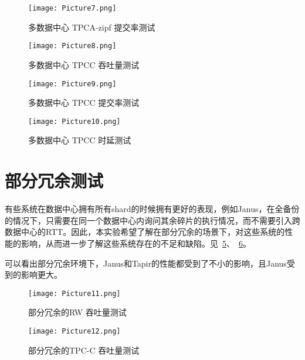 \begin{figure}[htb]
  \centering
  \texttt{[image: Picture7.png]}
  \caption{多数据中心 TPCA-zipf 提交率测试}
  \label{fig:pic7}
\end{figure}

\begin{figure}[htb]
  \centering
  \texttt{[image: Picture8.png]}
  \caption{多数据中心 TPCC 吞吐量测试}
  \label{fig:pic8}
\end{figure}

\begin{figure}[htb]
  \centering
  \texttt{[image: Picture9.png]}
  \caption{多数据中心 TPCC 提交率测试}
  \label{fig:pic9}
\end{figure}

\begin{figure}[htb]
  \centering
  \texttt{[image: Picture10.png]}
  \caption{多数据中心 TPCC 时延测试}
  \label{fig:pic10}
\end{figure}

\section{部分冗余测试}

有些系统在数据中心拥有所有shard的时候拥有更好的表现，例如Janus，在全备份的情况下，只需要在同一个数据中心内询问其余碎片的执行情况，而不需要引入跨数据中心的RTT。因此，本实验希望了解在部分冗余的场景下，对这些系统的性能的影响，从而进一步了解这些系统存在的不足和缺陷。见~\ref{fig:pic11}、~\ref{fig:pic12}。


可以看出部分冗余环境下，Janus和Tapir的性能都受到了不小的影响，且Janus受到的影响更大。


\begin{figure}[htb]
  \centering
  \texttt{[image: Picture11.png]}
  \caption{部分冗余的RW 吞吐量测试}
  \label{fig:pic11}
\end{figure}

\begin{figure}[htb]
  \centering
  \texttt{[image: Picture12.png]}
  \caption{部分冗余的TPC-C 吞吐量测试}
  \label{fig:pic12}
\end{figure}




